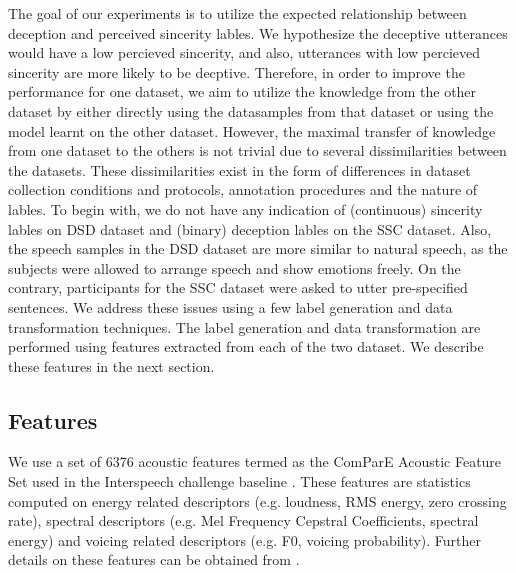 \documentclass{article}
\begin{document}
The goal of our experiments is to utilize the expected relationship between deception and perceived sincerity lables.
We hypothesize the deceptive utterances would have a low percieved sincerity, and also, utterances with low percieved sincerity are more likely to be decptive.
Therefore, in order to improve the performance for one dataset, we aim to utilize the knowledge from the other dataset by either directly using the datasamples from that dataset or using the model learnt on the other dataset.
However, the maximal transfer of knowledge from one dataset to the others is not trivial due to several dissimilarities between the datasets.
These dissimilarities exist in the form of differences in dataset collection conditions and protocols, annotation procedures and the nature of lables.
To begin with, we do not have any indication of (continuous) sincerity lables on DSD dataset and (binary) deception lables on the SSC dataset.
Also, the speech samples in the DSD dataset are more similar to natural speech, as the subjects were allowed to arrange speech and show emotions freely. 
On the contrary, participants for the SSC dataset were asked to utter pre-specified sentences. 
We address these issues using a few label generation and data transformation techniques.
The label generation and data transformation are performed using features extracted from each of the two dataset.
We describe these features in the next section.

\subsection{Features} 
We use a set of 6376 acoustic features termed as the ComParE Acoustic Feature Set used in the Interspeech challenge baseline \cite{schuller2015interspeech,schuller2016interspeech}.
These features are statistics computed on energy related descriptors (e.g. loudness, RMS energy, zero crossing rate), spectral descriptors (e.g. Mel Frequency Cepstral Coefficients, spectral energy) and voicing related descriptors (e.g. F0, voicing probability).
Further details on these features can be obtained from \cite{weninger2013acoustics}. 
\end{document}
